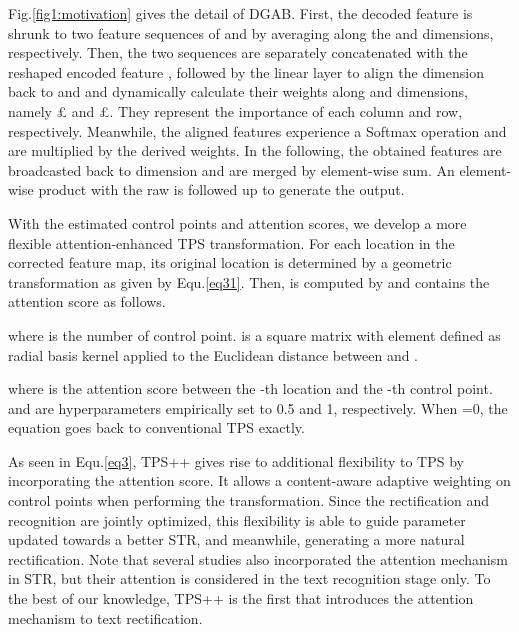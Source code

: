 \documentclass{article}
\begin{document}
Fig.\ref{fig1:motivation} gives the detail of DGAB. First, the decoded feature  is shrunk to two feature sequences of  and  by averaging along the  and  dimensions, respectively. Then, the two sequences are separately concatenated with the reshaped encoded feature , followed by the linear layer to align the dimension back to  and  and dynamically calculate their weights along  and  dimensions, namely £ and £. They represent the importance of each column and row, respectively. Meanwhile, the aligned features experience a Softmax operation and are multiplied by the derived weights. In the following, the obtained features are broadcasted back to dimension  and are merged by element-wise sum. An element-wise product with the raw  is followed up to generate the output. 

With the estimated control points and attention scores, we develop a more flexible attention-enhanced TPS transformation. For each location  in the corrected feature map, its original location  is determined by a geometric transformation as given by Equ.\ref{eq31}. Then,  is computed by  and  contains the attention score as follows.



\noindent where  is the number of control point.  is a square matrix with element  defined as radial basis kernel applied to the Euclidean distance between  and .




\noindent where  is the attention score between the -th location and the -th control point.  and  are hyperparameters empirically set to 0.5 and 1, respectively. When =0, the equation goes back to conventional TPS exactly.

As seen in Equ.\ref{eq3}, TPS++ gives rise to additional flexibility to TPS by incorporating the attention score. It allows a content-aware adaptive weighting on control points when performing the transformation. Since the rectification and recognition are jointly optimized, this flexibility is able to guide parameter updated towards a better STR, and meanwhile, generating a more natural rectification. Note that several studies \cite{lee2016attention_origin,cheng2017focusing_attention,shi2018aster,sheng2019nrtr,lin2021stan} also incorporated the attention mechanism in STR, but their attention is considered in the text recognition stage only. To the best of our knowledge, TPS++ is the first that introduces the attention mechanism to text rectification.
\end{document}
